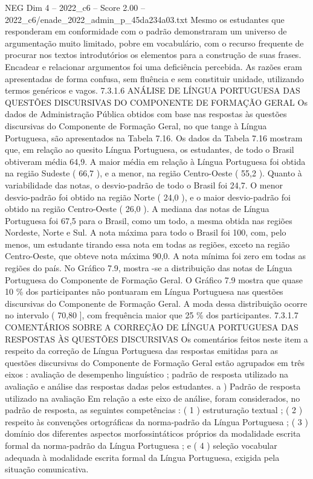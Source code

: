 \begin{textsample}{NEG Dim 4 – 2022\_c6 – Score 2.00 – 2022\_c6/enade\_2022\_admin\_p\_45da234a03.txt}
Mesmo os estudantes que responderam em conformidade com o padrão demonstraram um universo de argumentação muito limitado, pobre em vocabulário, com o recurso frequente de procurar nos textos introdutórios os elementos para a construção de suas frases.
Encadear e relacionar argumentos foi uma deficiência percebida.
As razões eram apresentadas de forma confusa, sem fluência e sem constituir unidade, utilizando termos genéricos e vagos. 7.3.1.6 ANÁLISE DE LÍNGUA PORTUGUESA DAS QUESTÕES DISCURSIVAS DO COMPONENTE DE FORMAÇÃO GERAL Os dados de Administração Pública obtidos com base nas respostas às questões discursivas do Componente de Formação Geral, no que tange à Língua Portuguesa, são apresentados na Tabela 7.16.
Os dados da Tabela 7.16 mostram que, em relação ao quesito Língua Portuguesa, os estudantes, de todo o Brasil obtiveram média 64,9.
A maior média em relação à Língua Portuguesa foi obtida na região Sudeste ( 66,7 ), e a menor, na região Centro-Oeste ( 55,2 ).
Quanto à variabilidade das notas, o desvio-padrão de todo o Brasil foi 24,7.
O menor desvio-padrão foi obtido na região Norte ( 24,0 ), e o maior desvio-padrão foi obtido na região Centro-Oeste ( 26,0 ).
A mediana das notas de Língua Portuguesa foi 67,5 para o Brasil, como um todo, a mesma obtida nas regiões Nordeste, Norte e Sul.
A nota máxima para todo o Brasil foi 100, com, pelo menos, um estudante tirando essa nota em todas as regiões, exceto na região Centro-Oeste, que obteve nota máxima 90,0.
A nota mínima foi zero em todas as regiões do país.
No Gráfico 7.9, mostra -se a distribuição das notas de Língua Portuguesa do Componente de Formação Geral.
O Gráfico 7.9 mostra que quase 10 \% dos participantes não pontuaram em Língua Portuguesa nas questões discursivas do Componente de Formação Geral.
A moda dessa distribuição ocorre no intervalo ( 70,80 ], com frequência maior que 25 \% dos participantes. 7.3.1.7 COMENTÁRIOS SOBRE A CORREÇÃO DE LÍNGUA PORTUGUESA DAS RESPOSTAS ÀS QUESTÕES DISCURSIVAS Os comentários feitos neste item a respeito da correção de Língua Portuguesa das respostas emitidas para as questões discursivas do Componente de Formação Geral estão agrupados em três eixos : avaliação de desempenho linguístico ; padrão de resposta utilizado na avaliação e análise das respostas dadas pelos estudantes. a ) Padrão de resposta utilizado na avaliação Em relação a este eixo de análise, foram considerados, no padrão de resposta, as seguintes competências : ( 1 ) estruturação textual ; ( 2 ) respeito às convenções ortográficas da norma-padrão da Língua Portuguesa ; ( 3 ) domínio dos diferentes aspectos morfossintáticos próprios da modalidade escrita formal da norma-padrão da Língua Portuguesa ; e ( 4 ) seleção vocabular adequada à modalidade escrita formal da Língua Portuguesa, exigida pela situação comunicativa.

\end{textsample}
